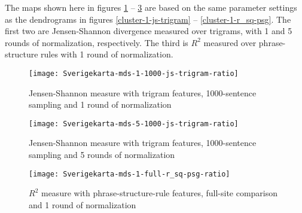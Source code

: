 The maps shown here in figures \ref{mds-1-1000-js-trigram} --
\ref{mds-1-full-r_sq-psg} are based on the same parameter settings as the
dendrograms in figures \ref{cluster-1-js-trigram} --
\ref{cluster-1-r_sq-psg}. The first two are Jensen-Shannon divergence
measured over trigrams, with 1 and 5 rounds of normalization,
respectively. The third is $R^2$ measured over phrase-structure rules
with 1 round of normalization.


\begin{figure}
\texttt{[image: Sverigekarta-mds-1-1000-js-trigram-ratio]}
\caption{Jensen-Shannon measure with trigram features, 1000-sentence sampling and
  1 round of normalization}
\label{mds-1-1000-js-trigram}
\end{figure}



\begin{figure}
\texttt{[image: Sverigekarta-mds-5-1000-js-trigram-ratio]}
\caption{Jensen-Shannon measure with trigram features, 1000-sentence sampling and
  5 rounds of normalization}
\label{mds-5-1000-js-trigram}
\end{figure}

\begin{figure}
\texttt{[image: Sverigekarta-mds-1-full-r\_sq-psg-ratio]}
\caption{$R^2$ measure with phrase-structure-rule features, full-site comparison and
  1 round of normalization}
\label{mds-1-full-r_sq-psg}
\end{figure}

